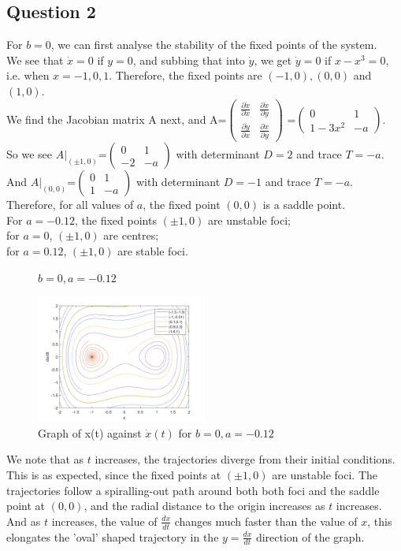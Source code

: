 \documentclass[10pt]{article}
\begin{document}
\subsection*{Question 2}
For $b=0$, we can first analyse the stability of the fixed points of the system.\\
We see that $\dot{x}=0$ if $y=0$, and subbing that into $\dot{y}$, we get $\dot{y}=0$ if $x-x^3=0$, i.e. when $x=-1,0,1$. Therefore, the fixed points are $(-1,0), (0,0)$ and $(1,0)$.\\
We find the Jacobian matrix A next, and A=$\begin{pmatrix}
\frac{\partial \dot{x}}{\partial x} & \frac{\partial \dot{x}}{\partial y} \\
\frac{\partial \dot{y}}{\partial x} & \frac{\partial \dot{x}}{\partial y} 
\end{pmatrix}$
=$\begin{pmatrix}
0 & 1 \\
1-3x^2 & -a
\end{pmatrix}$.\\
So we see $A|_{(\pm1,0)}$=$\begin{pmatrix}
0 & 1 \\
-2 & -a
\end{pmatrix}$ with determinant $D=2$ and trace $T=-a$.\\
And $A|_{(0,0)}$=$\begin{pmatrix}
0 & 1 \\
1 & -a
\end{pmatrix}$ with determinant $D=-1$ and trace $T=-a$.\\
Therefore, for all values of $a$, the fixed point $(0,0)$ is a saddle point.\\
For $a=-0.12$, the fixed points $(\pm1,0)$ are unstable foci;\\
for $a=0$, $(\pm1,0)$ are centres; \\
for $a=0.12$, $(\pm1,0)$ are stable foci.
\begin{figure}[H]
\centering
\textbf{$b=0,a=-0.12$}\par
\includegraphics[width=0.5\textwidth]{Files/q1,a=-012.png}
\caption{Graph of x(t) against $\dot{x}(t)$ for $b=0, a=-0.12$}
\end{figure}
\noindent We note that as $t$ increases, the trajectories diverge from their initial conditions. This is as expected, since the fixed points at $(\pm1,0)$ are unstable foci. The trajectories follow a spiralling-out path around both both foci and the saddle point at $(0,0)$, and the radial distance to the origin increases as $t$ increases. And as $t$ increases, the value of $\frac{dx}{dt}$ changes much faster than the value of $x$, this elongates the 'oval' shaped trajectory in the $y=\frac{dx}{dt}$ direction of the graph. 
\end{document}
